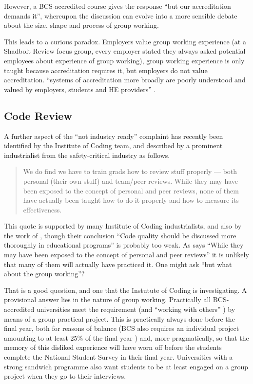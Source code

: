 \documentclass[sigconf]{acmart}
\begin{document}
However, a BCS-accredited course gives the response ``but our accreditation demands it'', whereupon the discussion can evolve into a more sensible debate about the size, shape and process of group working.
\par
This leads to a curious paradox. Employers value group working experience (at a Shadbolt Review focus group, every employer stated they always asked potential employees about experience of group working), group working experience is only taught because accreditation requires it, but employers do not value accreditation.  ``systems of accreditation more broadly are poorly understood and valued by employers, students and HE providers'' \cite[\P2.12]{Shadbolt2016a}.

\subsection{Code Review}
A further aspect of the ``not industry ready'' complaint has recently been identified by the Institute of Coding team, and described by a prominent industrialist from the safety-critical industry as follows.
\begin{quote}
We do find we have to train grads how to review stuff properly --- both personal (their own stuff) and team/peer reviews. While they may have been exposed to the concept of personal and peer reviews, none of them have actually been taught how to do it properly and how to measure its effectiveness. \cite{Chapman2018c}
\end{quote}
This quote is supported by many Institute of Coding industrialists, and also by the work of  \cite{Boerstleretal2018a}, though their conclusion ``Code quality should be discussed more thoroughly in educational programs'' is probably too weak. As \cite{Chapman2018c} says ``While they may have been exposed to the concept of personal and peer reviews'' it is unlikely that many of them will actually have practiced it.  One might ask ``but what about the group working''? 
\par
That is a good question, and one that the Instutute of Coding is investigating. A provisional answer lies in the nature of group working. Practically all BCS-accredited universities meet the requirement \cite[Requirement 2.3.1]{BCS2018a} (and ``working with others'' \cite[Requirement 2.3.2]{BCS2018a}) by means of a group practical project. This is practically always done before the final year, both for reasons of balance (BCS also requires an individual project amounting to at least 25\% of the final year \cite[Requirement 2.5.1]{BCS2018a}) and, more pragmatically, so that the memory of this disliked experience will have worn off before the students complete the National Student Survey in their final year. Universities with a strong sandwich programme also want students to be at least engaged on a group project when they go to their interviews.
\end{document}
